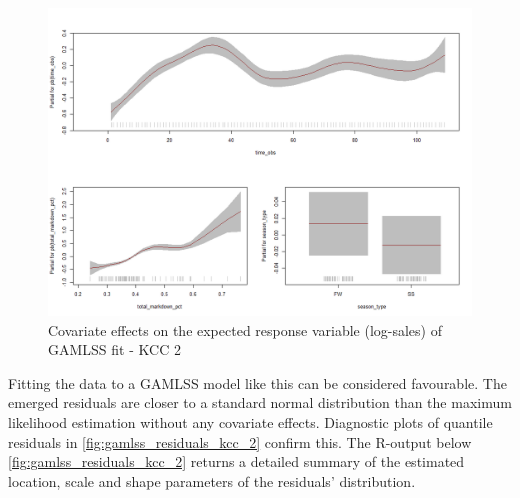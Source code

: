 \begin{figure}[H]
\centering
  \includegraphics[width=0.95\linewidth]{figures/gamlss_effects_kcc_2.png}
  \caption{Covariate effects on the expected response variable (log-sales) of GAMLSS fit - KCC 2}
  \label{fig:gamlss_effects_kcc_2}
\end{figure}






Fitting the data to a \ac{GAMLSS} model like this can be considered favourable. The emerged residuals are closer to a standard normal distribution than the maximum likelihood estimation without any covariate effects. Diagnostic plots of quantile residuals in \autoref{fig:gamlss_residuals_kcc_2} confirm this. The R-output below \autoref{fig:gamlss_residuals_kcc_2} returns a detailed summary of the estimated location, scale and shape parameters of the residuals' distribution.
\\




